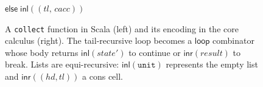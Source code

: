 \begin{figure}[t]
\begin{minipage}[t]{0.49\textwidth}
\qquad\qquad\qquad$\textsf{else}\; \textsf{inl}((\mathit{tl},\, \mathit{cacc}))$

\end{minipage}

\vspace{0.5em}
\caption{A \texttt{collect} function in Scala (left) and its encoding in the core calculus (right). The tail-recursive loop becomes a $\textsf{loop}$ combinator whose body returns $\textsf{inl}(\mathit{state'})$ to continue or $\textsf{inr}(\mathit{result})$ to break. Lists are equi-recursive: $\textsf{inl}(\texttt{unit})$ represents the empty list and $\textsf{inr}((\mathit{hd}, \mathit{tl}))$ a cons cell.}\label{fig:collect}
\end{figure}
